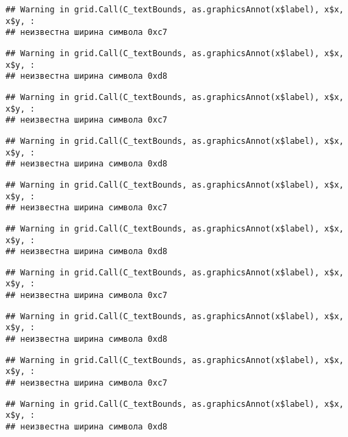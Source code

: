 \documentclass[
]{article}
\begin{document}
\begin{verbatim}
## Warning in grid.Call(C_textBounds, as.graphicsAnnot(x$label), x$x, x$y, :
## неизвестна ширина символа 0xc7
\end{verbatim}

\begin{verbatim}
## Warning in grid.Call(C_textBounds, as.graphicsAnnot(x$label), x$x, x$y, :
## неизвестна ширина символа 0xd8
\end{verbatim}

\begin{verbatim}
## Warning in grid.Call(C_textBounds, as.graphicsAnnot(x$label), x$x, x$y, :
## неизвестна ширина символа 0xc7
\end{verbatim}

\begin{verbatim}
## Warning in grid.Call(C_textBounds, as.graphicsAnnot(x$label), x$x, x$y, :
## неизвестна ширина символа 0xd8
\end{verbatim}

\begin{verbatim}
## Warning in grid.Call(C_textBounds, as.graphicsAnnot(x$label), x$x, x$y, :
## неизвестна ширина символа 0xc7
\end{verbatim}

\begin{verbatim}
## Warning in grid.Call(C_textBounds, as.graphicsAnnot(x$label), x$x, x$y, :
## неизвестна ширина символа 0xd8
\end{verbatim}

\begin{verbatim}
## Warning in grid.Call(C_textBounds, as.graphicsAnnot(x$label), x$x, x$y, :
## неизвестна ширина символа 0xc7
\end{verbatim}

\begin{verbatim}
## Warning in grid.Call(C_textBounds, as.graphicsAnnot(x$label), x$x, x$y, :
## неизвестна ширина символа 0xd8
\end{verbatim}

\begin{verbatim}
## Warning in grid.Call(C_textBounds, as.graphicsAnnot(x$label), x$x, x$y, :
## неизвестна ширина символа 0xc7
\end{verbatim}

\begin{verbatim}
## Warning in grid.Call(C_textBounds, as.graphicsAnnot(x$label), x$x, x$y, :
## неизвестна ширина символа 0xd8
\end{verbatim}
\end{document}
